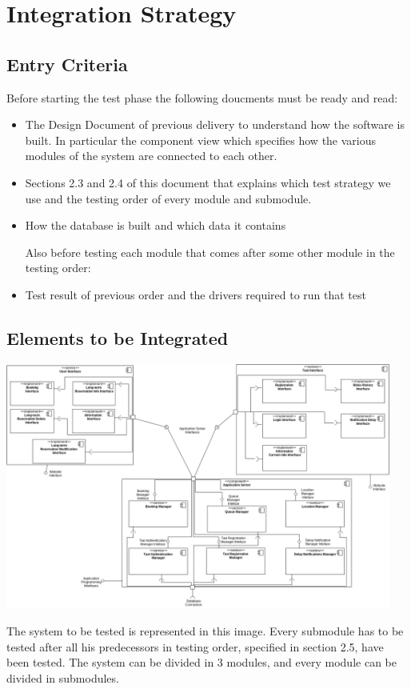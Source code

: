 \section{Integration Strategy}
\subsection{Entry Criteria}
	Before starting the test phase the following doucments must be ready and read:
	\begin{itemize}
		\item The Design Document of previous delivery to understand how the software is built. In particular the component view which specifies how the various modules of the system are connected to each other.
		\item Sections 2.3 and 2.4 of this document that explains which test strategy we use and the testing order of every module and submodule.
		\item How the database is built and which data it contains
		
		Also before testing each module that comes after some other module in the testing order:
		
		\item Test result of previous order and the drivers required to run that test
	\end{itemize} 
\subsection{Elements to be Integrated}
		\begin{center}
			\includegraphics[width=0.95\textwidth]{./images/test_modules.png}
		\end{center}
		The system to be tested is represented in this image. Every submodule has to be tested after all his predecessors in testing order, specified in section 2.5, have been tested. The system can be divided in 3 modules, and every module can be divided in submodules.
